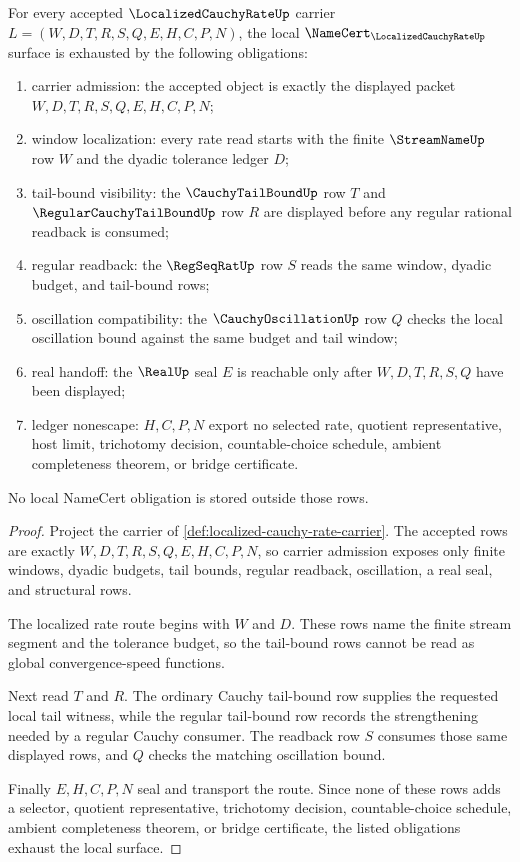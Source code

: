 \begin{theorem}
\label{thm:localized-cauchy-rate-namecert-obligations}
For every accepted $\LocalizedCauchyRateUp$ carrier $L=(W,D,T,R,S,Q,E,H,C,P,N)$, the local $\NameCert_{\LocalizedCauchyRateUp}$ surface is exhausted by the following obligations:
\begin{enumerate}
\item carrier admission: the accepted object is exactly the displayed packet $W,D,T,R,S,Q,E,H,C,P,N$;
\item window localization: every rate read starts with the finite $\StreamNameUp$ row $W$ and the dyadic tolerance ledger $D$;
\item tail-bound visibility: the $\CauchyTailBoundUp$ row $T$ and $\RegularCauchyTailBoundUp$ row $R$ are displayed before any regular rational readback is consumed;
\item regular readback: the $\RegSeqRatUp$ row $S$ reads the same window, dyadic budget, and tail-bound rows;
\item oscillation compatibility: the $\CauchyOscillationUp$ row $Q$ checks the local oscillation bound against the same budget and tail window;
\item real handoff: the $\RealUp$ seal $E$ is reachable only after $W,D,T,R,S,Q$ have been displayed;
\item ledger nonescape: $H,C,P,N$ export no selected rate, quotient representative, host limit, trichotomy decision, countable-choice schedule, ambient completeness theorem, or bridge certificate.
\end{enumerate}
No local NameCert obligation is stored outside those rows.
\end{theorem}
\begin{proof}
Project the carrier of \autoref{def:localized-cauchy-rate-carrier}. The accepted rows are exactly $W,D,T,R,S,Q,E,H,C,P,N$, so carrier admission exposes only finite windows, dyadic budgets, tail bounds, regular readback, oscillation, a real seal, and structural rows.

The localized rate route begins with $W$ and $D$. These rows name the finite stream segment and the tolerance budget, so the tail-bound rows cannot be read as global convergence-speed functions.

Next read $T$ and $R$. The ordinary Cauchy tail-bound row supplies the requested local tail witness, while the regular tail-bound row records the strengthening needed by a regular Cauchy consumer. The readback row $S$ consumes those same displayed rows, and $Q$ checks the matching oscillation bound.

Finally $E,H,C,P,N$ seal and transport the route. Since none of these rows adds a selector, quotient representative, trichotomy decision, countable-choice schedule, ambient completeness theorem, or bridge certificate, the listed obligations exhaust the local surface.
\end{proof}

